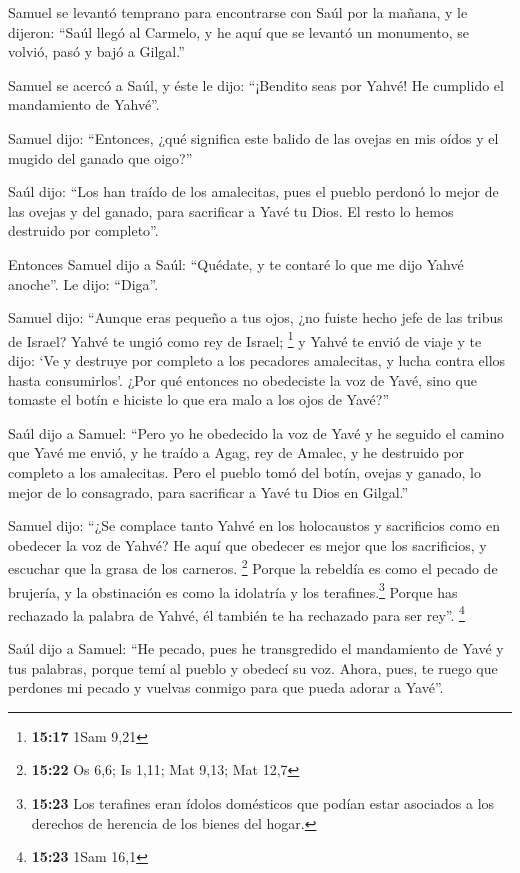 \begin{paracol}{2}
 Samuel se levantó temprano para encontrarse con Saúl por
la mañana, y le dijeron: ``Saúl llegó al Carmelo, y he aquí que se
levantó un monumento, se volvió, pasó y bajó a Gilgal.''

 Samuel se acercó a Saúl, y éste le dijo: ``¡Bendito seas
por Yahvé! He cumplido el mandamiento de Yahvé''.

 Samuel dijo: ``Entonces, ¿qué significa este balido de
las ovejas en mis oídos y el mugido del ganado que oigo?''

 Saúl dijo: ``Los han traído de los amalecitas, pues el
pueblo perdonó lo mejor de las ovejas y del ganado, para sacrificar a
Yavé tu Dios. El resto lo hemos destruido por completo''.

 Entonces Samuel dijo a Saúl: ``Quédate, y te contaré lo
que me dijo Yahvé anoche''. Le dijo: ``Diga''.

 Samuel dijo: ``Aunque eras pequeño a tus ojos, ¿no
fuiste hecho jefe de las tribus de Israel? Yahvé te ungió como rey de
Israel; \footnote{\textbf{15:17} 1Sam 9,21}  y Yahvé te
envió de viaje y te dijo: `Ve y destruye por completo a los pecadores
amalecitas, y lucha contra ellos hasta consumirlos'. 
¿Por qué entonces no obedeciste la voz de Yavé, sino que tomaste el
botín e hiciste lo que era malo a los ojos de Yavé?''

 Saúl dijo a Samuel: ``Pero yo he obedecido la voz de
Yavé y he seguido el camino que Yavé me envió, y he traído a Agag, rey
de Amalec, y he destruido por completo a los amalecitas. 
Pero el pueblo tomó del botín, ovejas y ganado, lo mejor de lo
consagrado, para sacrificar a Yavé tu Dios en Gilgal.''

 Samuel dijo: ``¿Se complace tanto Yahvé en los
holocaustos y sacrificios como en obedecer la voz de Yahvé? He aquí que
obedecer es mejor que los sacrificios, y escuchar que la grasa de los
carneros. \footnote{\textbf{15:22} Os 6,6; Is 1,11; Mat 9,13; Mat 12,7}
 Porque la rebeldía es como el pecado de brujería, y la
obstinación es como la idolatría y los terafines.\footnote{\textbf{15:23}
  Los terafines eran ídolos domésticos que podían estar asociados a los
  derechos de herencia de los bienes del hogar.} Porque has rechazado la
palabra de Yahvé, él también te ha rechazado para ser rey''. \footnote{\textbf{15:23}
  1Sam 16,1}

 Saúl dijo a Samuel: ``He pecado, pues he transgredido el
mandamiento de Yavé y tus palabras, porque temí al pueblo y obedecí su
voz.  Ahora, pues, te ruego que perdones mi pecado y
vuelvas conmigo para que pueda adorar a Yavé''.


\end{paracol}
